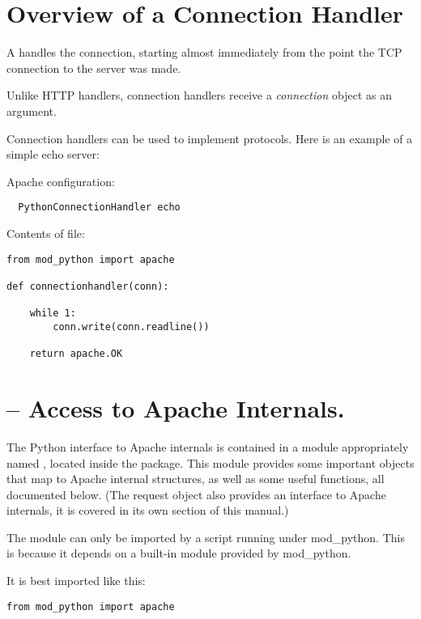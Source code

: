 \section{Overview of a Connection Handler\label{pyapi-conn}}

A  handles the connection, starting almost
immediately from the point the TCP connection to the server was
made. 

Unlike HTTP handlers, connection handlers receive a \emph{connection}
object as an argument.

Connection handlers can be used to implement protocols. Here is an
example of a simple echo server:

Apache configuration:
\begin{verbatim}
  PythonConnectionHandler echo
\end{verbatim}

Contents of  file:

\begin{verbatim}
from mod_python import apache

def connectionhandler(conn):

    while 1:
        conn.write(conn.readline())

    return apache.OK
\end{verbatim}

\section{ -- Access to Apache Internals.}

The Python interface to Apache internals is contained in a module
appropriately named , located inside the
 package. This module provides some important
objects that map to Apache internal structures, as well as some useful
functions, all documented below. (The request object also provides an
interface to Apache internals, it is covered in its own section of
this manual.)

 The  module can only be
imported by a script running under mod_python. This is because it
depends on a built-in module  provided by
mod_python.

It is best imported like this:

\begin{verbatim}
from mod_python import apache
\end{verbatim}

